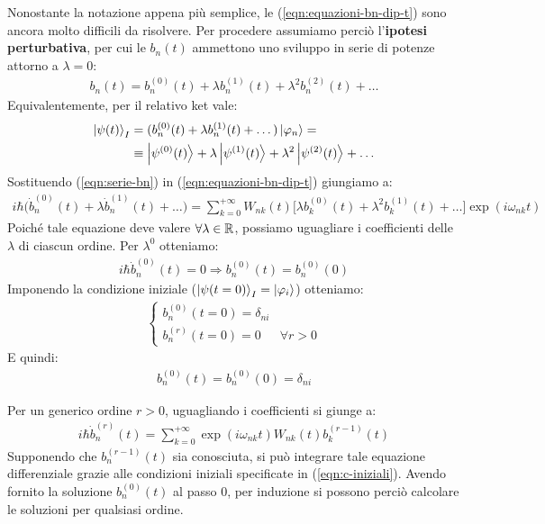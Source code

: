 \documentclass[../../InformazioneQuantistica.tex]{subfiles}
\begin{document}
Nonostante la notazione appena più semplice, le (\ref{eqn:equazioni-bn-dip-t}) sono ancora molto difficili da risolvere. Per procedere assumiamo perciò l'\textbf{ipotesi perturbativa}, per cui le $b_n(t)$ ammettono uno sviluppo in serie di potenze attorno a $\lambda=0$:
\begin{align}
b_n(t) = b_n^{(0)} (t) + \lambda b_n^{(1)}(t) + \lambda^2 b_n^{(2)}(t) + \dots
\label{eqn:serie-bn}
\end{align}
Equivalentemente, per il relativo ket vale:
\begin{align*}
    \Ket{\psi(t)}_I &= (b_n^{(0)}(t) + \lambda b_n^{(1)}(t) + \dots ) \Ket{\varphi_n} =\\
    &\equiv \Ket{\psi^{(0)}(t)} + \lambda \Ket{\psi^{(1)}(t)} + \lambda^2 \Ket{\psi^{(2)}(t)} + \dots 
\end{align*}
Sostituendo (\ref{eqn:serie-bn}) in (\ref{eqn:equazioni-bn-dip-t}) giungiamo a:
\begin{align*}
    i\hbar \Big( \dot{b}_n^{(0)}(t) + \lambda \dot{b}_n^{(1)}(t) + \dots \Big) = \sum_{k=0}^{+\infty} W_{nk}(t) \Big[\lambda b_k^{(0)}(t) + \lambda^2 b_k^{(1)}(t) + \dots \Big] \exp(i\omega_{nk}t)
\end{align*}
Poiché tale equazione deve valere $\forall \lambda \in \mathbb{R}$, possiamo uguagliare i coefficienti delle $\lambda$ di ciascun ordine. Per $\lambda^0$ otteniamo:
\begin{align*}
    i\hbar \dot{b}_n^{(0)}(t) = 0 \Rightarrow b_n^{(0)}(t) = b_n^{(0)}(0)
\end{align*}
Imponendo la condizione iniziale ($\Ket{\psi(t=0)}_I = \Ket{\varphi_i}$) otteniamo:
\begin{align}
\begin{cases}
b_n^{(0)}(t=0) = \delta_{ni}\\
b_n^{(r)}(t=0) = 0 & \forall r>0
\end{cases}
\label{eqn:c-iniziali}
\end{align}
E quindi:
\begin{align*}
    b_n^{(0)}(t) = b_n^{(0)}(0) = \delta_{ni}
\end{align*}

Per un generico ordine $r>0$, uguagliando i coefficienti si giunge a:
\begin{align*}
    i\hbar \dot{b}_n^{(r)} (t) = \sum_{k=0}^{+\infty} \exp(i\omega_{nk}t) W_{nk}(t) b_k^{(r-1)}(t)
\end{align*}
Supponendo che $b_n^{(r-1)}(t)$ sia conosciuta, si può integrare tale equazione differenziale grazie alle condizioni iniziali specificate in (\ref{eqn:c-iniziali}). Avendo fornito la soluzione $b_n^{(0)}(t)$ al passo $0$, per induzione si possono perciò calcolare le soluzioni per qualsiasi ordine.\\
\end{document}
